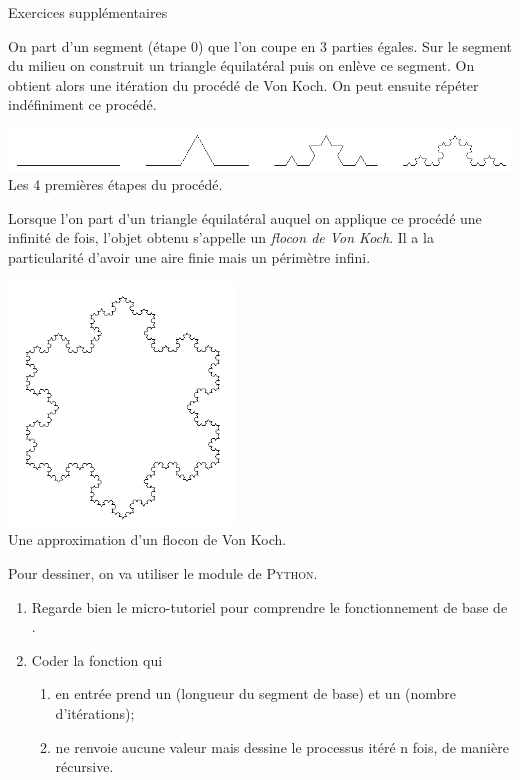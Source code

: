 \documentclass[a4paper,12pt,french]{article}
\begin{document}
\newpage
{\huge\titlefont\color{subsection@color} Exercices supplémentaires}
\begin{exercice}
	On part d'un segment (étape 0) que l'on coupe en 3 parties égales. Sur le segment du milieu on construit un triangle équilatéral puis on enlève ce segment. On obtient alors une itération du procédé de Von Koch. On peut ensuite répéter indéfiniment ce procédé.
	\begin{center}
		\includegraphics[width=16cm]{img/koch}\\
		\scriptsize Les 4 premières étapes du procédé.
	\end{center}
	Lorsque l'on part d'un triangle équilatéral auquel on applique ce procédé une infinité de fois, l'objet obtenu s'appelle un \textit{flocon de Von Koch}. Il a la particularité d'avoir une aire finie mais un périmètre infini.
	\begin{center}
					\includegraphics[width=6cm]{img/flocon}\\
		\scriptsize Une approximation d'un flocon de Von Koch.
	\end{center}
Pour dessiner, on va utiliser le module  de \textsc{Python}.
\begin{enumerate}[\bfseries 1.]
	\item  Regarde bien le micro-tutoriel pour comprendre le fonctionnement de base de .
	\item 	Coder la fonction  qui
		\begin{enumerate}[--]
			\item 	en entrée prend un  (longueur du segment de base) et un  (nombre d'itérations);
			\item 	ne renvoie aucune valeur mais dessine le processus itéré n fois, de manière récursive.
		\end{enumerate}
\end{enumerate}
\end{exercice}
\end{document}
